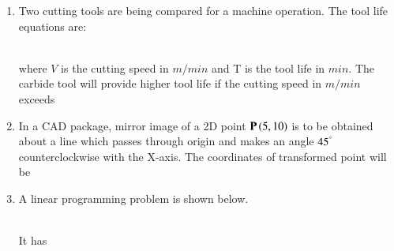 \documentclass[journal,12pt,onecolumn]{IEEEtran}
\theoremstyle{remark}
\begin{document}
\begin{enumerate}
\hfill{}
\begin{enumerate}
\end{enumerate}

\item Two cutting tools are being compared for a machine operation. The tool life equations are:
\\\begin{table}[h!]    
  \centering
  \resizebox{0.3\textwidth}{!}{}
\end{table}\\
where $V$ is the cutting speed in $m/min$ and T is the tool life in $min$. The carbide tool will provide higher tool life if the cutting speed in $m/min$ exceeds 

\hfill{}
\begin{enumerate}
\end{enumerate}

\item In a CAD package, mirror image of a 2D point $\mathbf{P}\left(5,10\right)$ is to be obtained about a line which passes through origin and makes an angle $45^\degree$ counterclockwise with the X-axis. The coordinates of transformed point will be

\hfill{}
\begin{enumerate}
\end{enumerate}

\item A linear programming problem is shown below.
\\\begin{table}[h!]    
  \centering
  \resizebox{0.3\textwidth}{!}{}
\end{table}\\
It has


\end{enumerate}
\end{document}
